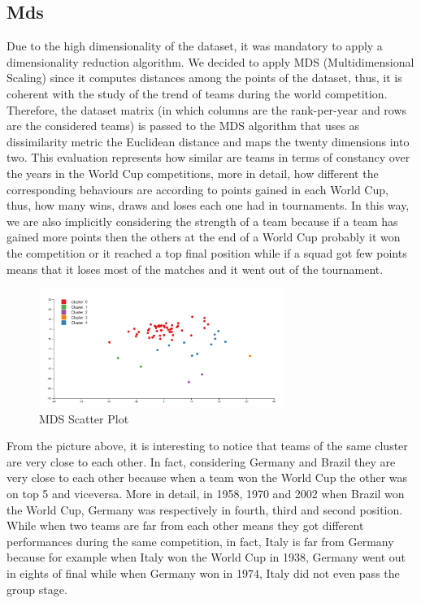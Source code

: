 \documentclass[journal]{vgtc}                %
\begin{document}
\subsection{Mds}
Due to the high dimensionality of the dataset, it was mandatory to apply a dimensionality reduction algorithm. We decided to apply MDS (Multidimensional Scaling) since it computes distances among the points of the dataset, thus, it is coherent with the study of the trend of teams during the world competition. \\
Therefore, the dataset matrix (in which columns are the rank-per-year and rows are the considered teams) is passed to the MDS algorithm that uses as dissimilarity metric the Euclidean distance and maps the twenty dimensions into two.  
This evaluation represents how similar are teams in terms of constancy over the years in the World Cup competitions, more in detail, how different the corresponding behaviours are according to points gained in each World Cup, thus, how many wins, draws and loses each one had in tournaments. In this way, we are also implicitly considering the strength of a team because if a team has gained more points then the others at the end of a World Cup probably it won the competition or it reached a top final position while if a squad got few points means that it loses most of the matches and it went out of the tournament.
\begin{figure}[H]
	\includegraphics[width=80mm,scale=1]{mds.png}
	\caption{MDS Scatter Plot}
\end{figure}
\noindent From the picture above, it is interesting to notice that teams of the same cluster are very close to each other.
In fact, considering Germany and Brazil they are very close to each other because when a team  won the World Cup the other was on top 5 and viceversa. More in detail, in 1958, 1970 and 2002 when Brazil won the World Cup, Germany was respectively in fourth, third and second position. 
While when two teams are far from each other means they got different performances during the same competition, in fact, Italy is far from Germany because for example when Italy won the World Cup in 1938, Germany went out in eights of final while when Germany won in 1974, Italy did not even pass the group stage.
\end{document}
